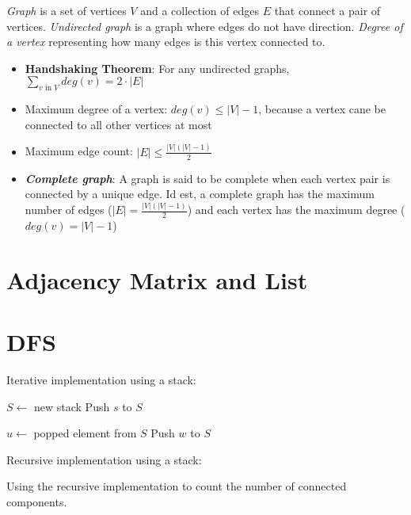 
\textit{Graph} is a set of vertices $V$ and a collection of edges $E$ that connect a pair of vertices. \textit{Undirected graph} is a graph where edges do not have direction. \textit{Degree of a vertex} representing how many edges is this vertex connected to.

\begin{itemize}
  \item \textbf{Handshaking Theorem}: For any undirected graphs, \(\sum_{v \text{ in } V} deg(v) = 2 \cdot |E|\)
  \item Maximum degree of a vertex: $deg(v) \leq |V| - 1$, because a vertex cane be connected to all other vertices at most
  \item Maximum edge count: $|E| \leq \frac{|V|(|V| - 1)}{2}$
  \item \textbf{\textit{Complete graph}}: A graph is said to be complete when each vertex pair is connected by a unique edge. Id est, a complete graph has the maximum number of edges ($|E| = \frac{|V|(|V| - 1)}{2}$) and each vertex has the maximum degree ($deg(v) = |V| - 1$)
\end{itemize}

\section{Adjacency Matrix and List}

\section{DFS}

\noindent Iterative implementation using a stack:

\noindent \hrulefill
\begin{algorithmic}[1]
   
  \State $S \gets$ new stack
  \State Push $s$ to $S$
  \item[]
  \State $u \gets$ popped element from $S$
  \State Push $w$ to $S$
  \EndIf
  \EndFor
  \EndIf
  \EndWhile
  \EndFunction
\end{algorithmic}
\noindent \hrulefill

\noindent Recursive implementation using a stack:

\noindent Using the recursive implementation to count the number of connected components.

